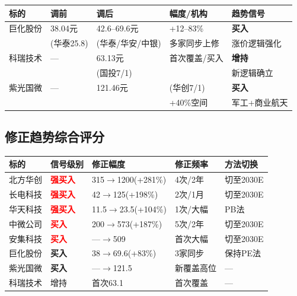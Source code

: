 \documentclass[a4paper,11pt,fontset=none]{ctexart}
\begin{document}
\begin{exhibitbox}
\begin{tabularx}{\textwidth}{L{2cm}L{2cm}L{2cm}L{2.5cm}X}
\toprule
\textbf{标的} & \textbf{调前} & \textbf{调后} & \textbf{幅度/机构} & \textbf{趋势信号} \\
\midrule
巨化股份 & 38.04元 & 42.6--69.6元 & +12--83\% & \textbf{买入} \\
 & (华泰25.8) & (华泰/华安/中银) & 多家同步上修 & 涨价逻辑强化 \\
\midrule
科瑞技术 & --- & 63.13元 & 首次覆盖/买入 & \textbf{增持} \\
 & & (国投7/1) & & 新逻辑确立 \\
\midrule
紫光国微 & --- & 121.46元 & (华创7/1) & \textbf{买入} \\
 & & & +40\%空间 & 军工+商业航天 \\
\bottomrule
\end{tabularx}
\end{exhibitbox}

\subsection*{修正趋势综合评分}

\begin{tabularx}{\textwidth}{L{2.5cm}L{2cm}L{2.5cm}L{2.5cm}X}
\toprule
\textbf{标的} & \textbf{信号级别} & \textbf{修正幅度} & \textbf{修正频率} & \textbf{方法切换} \\
\midrule
北方华创 & \textcolor{red}{\textbf{强买入}} & 315$\to$1200(+281\%) & 4次/2年 & 切至2030E \\
长电科技 & \textcolor{red}{\textbf{强买入}} & 42$\to$125(+198\%) & 2次/1月 & 切至2030E \\
华天科技 & \textcolor{red}{\textbf{强买入}} & 11.5$\to$23.5(+104\%) & 1次/大幅 & PB法 \\
中微公司 & \textcolor{red}{\textbf{买入}} & 200$\to$573(+187\%) & 5次/2年 & 切至2030E \\
安集科技 & \textcolor{red}{\textbf{买入}} & ---$\to$509 & 首次大幅 & 切至2030E \\
巨化股份 & \textbf{买入} & 38$\to$69.6(+83\%) & 3家同步 & 保持PE法 \\
紫光国微 & \textbf{买入} & ---$\to$121.5 & 新覆盖高位 & --- \\
科瑞技术 & 增持 & 首次63.1 & 首次覆盖 & --- \\
\bottomrule
\end{tabularx}
\end{document}
